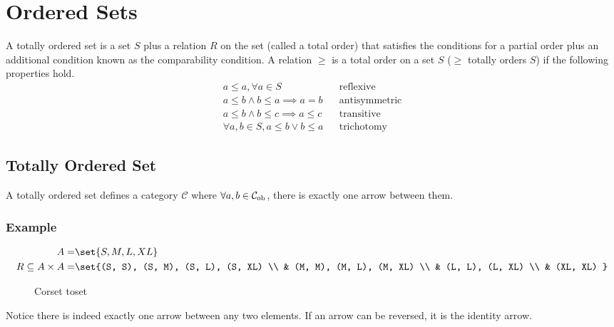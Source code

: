 \section{Ordered Sets}
\begin{definition}
	A totally ordered set is a set $S$ plus a relation $R$ on the set (called a total
	order) that satisfies the conditions for a partial order plus an additional
	condition known as the comparability condition. A relation $\geq$ is a total order
	on a set $S$ ($\geq$ totally orders $S$) if the following properties hold.
	\setcounter{equation}{0}
	\begin{align}
		a\leq a, \forall a \in S                &  & \text{reflexive}     \\
		a\leq b \land b\leq a \implies a=b      &  & \text{antisymmetric} \\
		a\leq b \land b\leq c \implies a\leq c  &  & \text{transitive}    \\
		\forall a,b \in S, a\leq b \lor b\leq a &  & \text{trichotomy}
	\end{align}

\end{definition}
\subsection{Totally Ordered Set}
A totally ordered set defines a category $\mathcal{C}$ where $\forall a, b \in
	\mathcal{C}_{\text{ob}}{}$, there is exactly one arrow between them.

\subsubsection{Example}
\begin{align*}
	A=                     & \set{S, M, L, XL}                    \\
	R\subseteq A\times A = & \set{(S, S), (S, M), (S, L), (S, XL) \\
	                       & (M, M), (M, L), (M, XL)              \\
	                       & (L, L), (L, XL)                      \\
	                       & (XL, XL)
	}
\end{align*}
\begin{figure}[H]
	\begin{center}
		
	\end{center}
	\caption{Corset toset}
\end{figure}
Notice there is indeed exactly one arrow between any two elements. If an
arrow can be reversed, it is the identity arrow.

